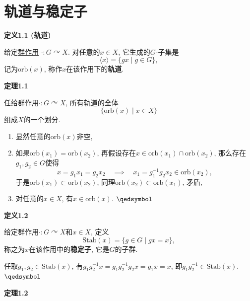 \documentclass[UTF8]{ctexart}
\begin{document}
\setlength{\abovedisplayskip}{1pt}
\setlength{\belowdisplayskip}{1pt}

\section{轨道与稳定子}

\hypertarget{sec:定义1.1}{}
\noindent\textbf{定义1.1 (轨道)}

给定\href{01 群作用与 G-集#nameddest=sec:定义1.1}{群作用}
$\cdot:G\curvearrowright X$. 对任意的$x\in X$, 它生成的$G$-子集是
\[
    \langle x\rangle=\{gx\mid g\in G\},
\]
记为$\mathrm{orb}(x)$, 称作$x$在该作用下的\textbf{轨道}.

\vspace{10pt}

\hypertarget{sec:定理1.1}{}
\noindent\textbf{定理1.1}

任给群作用$\cdot:G\curvearrowright X$, 所有轨道的全体
\[
    \{\mathrm{orb}(x)\mid x\in X\}
\]
组成$X$的一个划分.


\begin{enumerate}
    \item 显然任意的$\mathrm{orb}(x)$非空,
    \item 如果$\mathrm{orb}(x_1)=\mathrm{orb}(x_2)$,
    再假设存在$x\in\mathrm{orb}(x_1)\cap\mathrm{orb}(x_2)$,
    那么存在$g_1,g_2\in G$使得
    \[
        x=g_1x_1=g_2x_2\quad\implies\quad x_1=g_1^{-1}g_2x_2\in\mathrm{orb}(x_2),
    \]
    于是$\mathrm{orb}(x_1)\subset\mathrm{orb}(x_2)$,
    同理$\mathrm{orb}(x_2)\subset\mathrm{orb}(x_1)$, 矛盾,
    \item 对任意的$x\in X$, 有$x\in\mathrm{orb}(x)$. \hfill $\qedsymbol$
\end{enumerate}

\vspace{10pt}

\hypertarget{sec:定义1.2}{}
\noindent\textbf{定义1.2}

给定群作用$\cdot:G\curvearrowright X$和$x\in X$, 定义
\[
    \mathrm{Stab}(x)=\{g\in G\mid gx=x\},
\]
称之为$x$在该作用中的\textbf{稳定子}, 它是$G$的子群.


任取$g_1,g_2\in\mathrm{Stab}(x)$, 有$g_1g_2^{-1}x=g_1g_2^{-1}g_2x=g_1x=x$,
即$g_1g_2^{-1}\in\mathrm{Stab}(x)$. \hfill $\qedsymbol$

\vspace{10pt}

\hypertarget{sec:定理1.2}{}
\noindent\textbf{定理1.2}
\end{document}
